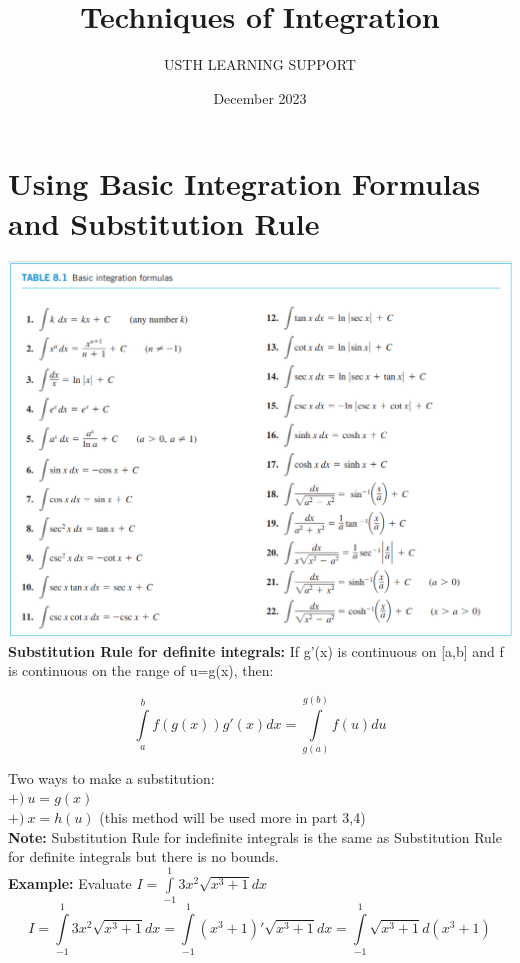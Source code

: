\documentclass{article}
\title{Techniques of Integration}
\author{USTH LEARNING SUPPORT}
\date{December 2023}
\begin{document}
\maketitle
\tableofcontents
\newpage
\section{Using Basic Integration Formulas and Substitution Rule}
\includegraphics[width=1\linewidth]{formula.png}
\textbf{Substitution Rule for definite integrals:} If g'(x) is continuous on [a,b] and f is continuous on the range of u=g(x), then:
     \begin{center}
         \begin{equation*}
            \displaystyle\int\limits_{a}^{b}f(g(x))g'(x)dx = \displaystyle\int\limits_{g(a)}^{g(b)}f(u) du
         \end{equation*}
     \end{center}
    Two ways to make a substitution: \\
            $+)\ u=g(x)$ \\
            $+)\ x=h(u)$ (this method will be used more in part 3,4) \\
    \textbf{Note:} Substitution Rule for indefinite integrals is the same as Substitution Rule for definite integrals but there is no bounds.\\
    \textbf{Example:} Evaluate $I=\displaystyle\int\limits_{-1}^{1} 3x^2\sqrt{x^3+1}dx$\\
    \begin{equation*}
         I=\displaystyle\int\limits_{-1}^{1} 3x^2\sqrt{x^3+1}dx = \displaystyle\int\limits_{-1}^{1}(x^3+1)'\sqrt{x^3+1}dx = \displaystyle\int\limits_{-1}^{1} \sqrt{x^3+1}d(x^3+1)
    \end{equation*}
\end{document}
